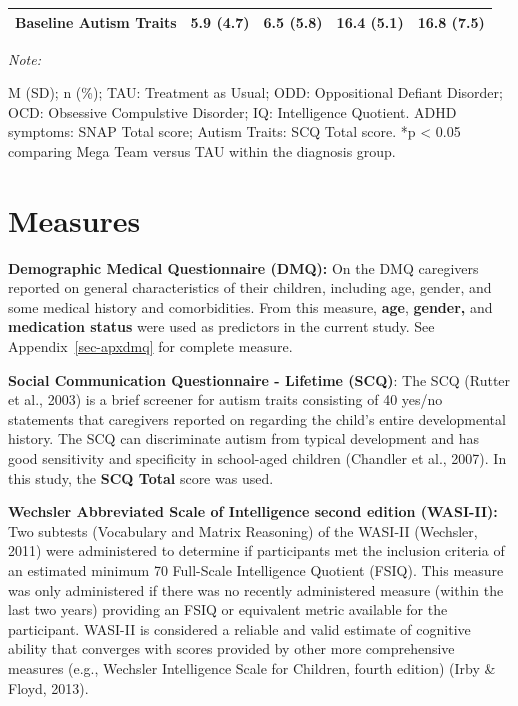 \documentclass[
  letterpaper,
]{ut-thesis}
\begin{document}
\begin{table}
{\begin{threeparttable}
{\begin{tabular}{lcccc}
Baseline Autism Traits & 5.9 (4.7) & 6.5 (5.8) & 16.4 (5.1) & 16.8 (7.5)\\
\bottomrule
\end{tabular}}
\begin{tablenotes}[para]
\item \textit{Note: } 
\item M (SD); n (\%); TAU: Treatment as Usual; ODD: Oppositional Defiant Disorder; OCD: Obsessive Compulstive Disorder; IQ: Intelligence Quotient. ADHD symptoms: SNAP Total score; Autism Traits: SCQ Total score. *p < 0.05 comparing Mega Team versus TAU within the diagnosis group.
\end{tablenotes}
\end{threeparttable}

}

\end{table}%

\section{Measures}\label{measures}

\textbf{Demographic Medical Questionnaire (DMQ):} On the DMQ caregivers
reported on general characteristics of their children, including age,
gender, and some medical history and comorbidities. From this measure,
\textbf{age}, \textbf{gender,} and \textbf{medication status} were used
as predictors in the current study. See Appendix~\ref{sec-apxdmq} for
complete measure.

\textbf{Social Communication Questionnaire - Lifetime (SCQ)}: The SCQ
(Rutter et al., 2003) is a brief screener for autism traits consisting
of 40 yes/no statements that caregivers reported on regarding the
child's entire developmental history. The SCQ can discriminate autism
from typical development and has good sensitivity and specificity in
school-aged children (Chandler et al., 2007). In this study, the
\textbf{SCQ Total} score was used.

\textbf{Wechsler Abbreviated Scale of Intelligence second edition
(WASI-II):} Two subtests (Vocabulary and Matrix Reasoning) of the
WASI-II (Wechsler, 2011) were administered to determine if participants
met the inclusion criteria of an estimated minimum 70 Full-Scale
Intelligence Quotient (FSIQ). This measure was only administered if
there was no recently administered measure (within the last two years)
providing an FSIQ or equivalent metric available for the participant.
WASI-II is considered a reliable and valid estimate of cognitive ability
that converges with scores provided by other more comprehensive measures
(e.g., Wechsler Intelligence Scale for Children, fourth edition) (Irby
\& Floyd, 2013).
\end{document}
